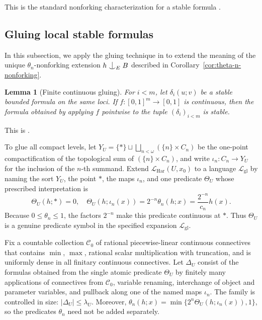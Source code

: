 \documentclass{amsart}
\newtheorem{lemma}[theorem]{Lemma}
\theoremstyle{definition}
\theoremstyle{remark}
\newcommand{\forkindep}[1][]{%
	\mathrel{
		\mathop{
			\vcenter{
				\hbox{\oalign{\noalign{\kern-.3ex}\hfil$\vert$\hfil\cr
						\noalign{\kern-.7ex}
						$\smile$\cr\noalign{\kern-.3ex}}}
			}
		}\displaylimits_{#1}
	}
}
\numberwithin{equation}{section}
\begin{document}
This is the standard nonforking characterization for a stable formula \cite[Corollary~8.10]{Yaacov2008CONTINUOUSFO}.



\subsection{Gluing local stable formulas} 
\label{subsec:gluing-local-stable-formulas}

In this subsection, we apply the gluing technique in \cite{Yaacov2008CONTINUOUSFO} to extend the meaning of the
unique $\theta_n$-nonforking extension $h\forkindep[E]B$ described in Corollary~\ref{cor:theta-n-nonforking}.

\begin{lemma}[Finite continuous gluing]
\label{lem:finite-continuous-gluing}
For $i<m$, let $\delta_i(u;v)$ be a stable bounded formula on the
same loci. If $f:[0,1]^m\to[0,1]$ is continuous, then the formula obtained by applying $f$ pointwise to the tuple $(\delta_i)_{i<m}$ is stable.
\end{lemma}

This is \cite[Lemma 8.1]{Yaacov2008CONTINUOUSFO}.

To glue all compact levels, let
$Y_U=\{*\}\sqcup\bigsqcup_{n<\omega}(\{n\}\times C_n)$ be the
one-point compactification of the topological sum of $(\{n\}\times C_n)$, and
write $\iota_n:C_n\to Y_U$ for the inclusion of the $n$-th summand.
Extend $\mathcal L_{\mathrm{Har}}(U,x_0)$ to a language
$\mathcal L_{\mathrm{gl}}$ by naming the sort $Y_U$, the point $*$,
the maps $\iota_n$, and one predicate $\Theta_U$ whose prescribed
interpretation is
$$
\Theta_U(h;*)=0,\quad
\Theta_U(h;\iota_n(x))=2^{-n}\theta_n(h;x)
=\frac{2^{-n}}{c_n}h(x).
$$
Because $0\le\theta_n\le1$, the factors $2^{-n}$ make this predicate
continuous at $*$. Thus $\Theta_U$ is a genuine predicate symbol in the specified expansion $\mathcal L_{\mathrm{gl}}$.

Fix a countable collection $\mathcal C_0$ of rational piecewise-linear
continuous connectives that contains $\min$, $\max$, rational scalar
multiplication with truncation, and is uniformly dense in all finitary
continuous connectives. Let $\Delta_U$ consist of the formulas obtained
from the single atomic predicate $\Theta_U$ by finitely many
applications of connectives from $\mathcal C_0$, variable renaming,
interchange of object and parameter variables, and pullback along one
of the named maps $\iota_n$. The family is controlled in size:
$|\Delta_U|\le\lambda_U$. Moreover,
$\theta_n(h;x)=\min\{2^n\Theta_U(h;\iota_n(x)),1\}$, so the predicates $\theta_n$ need not be added separately.
\end{document}
